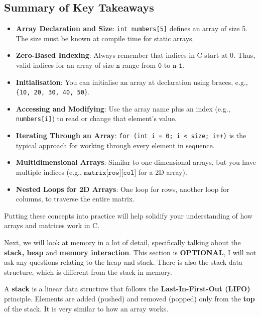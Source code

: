 \documentclass[a4paper,12pt]{article}
\begin{document}
\hrulefill

\subsection{Summary of Key Takeaways}
\begin{itemize}
  \item \textbf{Array Declaration and Size}: \verb|int numbers[5]| defines an array of size 5. The size must be known at compile time for static arrays.
  \item \textbf{Zero-Based Indexing}: Always remember that indices in C start at 0. Thus, valid indices for an array of size \(\texttt{n}\) range from \(\texttt{0}\) to \(\texttt{n-1}\).
  \item \textbf{Initialisation}: You can initialise an array at declaration using braces, e.g., \verb|{10, 20, 30, 40, 50}|.
  \item \textbf{Accessing and Modifying}: Use the array name plus an index (e.g., \verb|numbers[i]|) to read or change that element’s value.
  \item \textbf{Iterating Through an Array}: \verb|for (int i = 0; i < size; i++)| is the typical approach for working through every element in sequence.
  \item \textbf{Multidimensional Arrays}: Similar to one-dimensional arrays, but you have multiple indices (e.g., \(\texttt{matrix[row][col]}\) for a 2D array).
  \item \textbf{Nested Loops for 2D Arrays}: One loop for rows, another loop for columns, to traverse the entire matrix.
\end{itemize}

Putting these concepts into practice will help solidify your understanding of how arrays and matrices work in C. \\

\begin{center}
    Next, we will look at memory in a lot of detail, specifically talking about the \textbf{stack, heap} and \textbf{memory interaction}. This section is \textbf{OPTIONAL}, I will not ask any questions relating to the heap and stack. There is also the stack data structure, which is different from the stack in memory.
\end{center}

\hrulefill

\newpage

A \textbf{stack} is a linear data structure that follows the \textbf{Last-In-First-Out (LIFO)} principle. Elements are added (pushed) and removed (popped) only from the \textbf{top} of the stack. It is very similar to how an array works.
\end{document}
